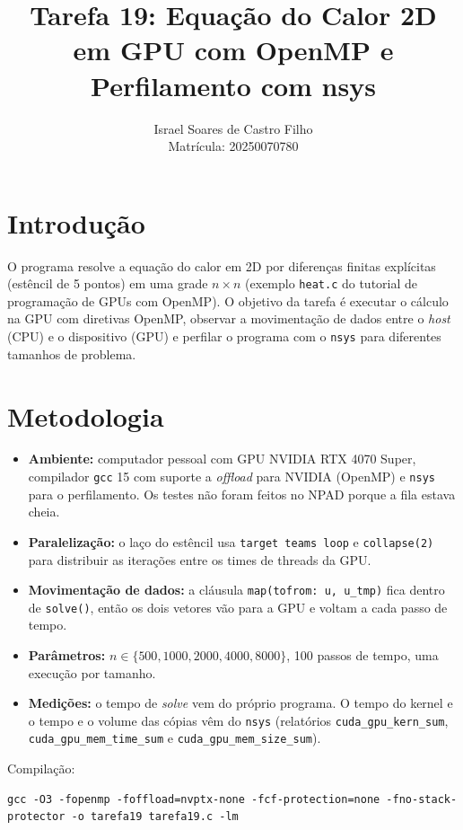 \documentclass[a4paper,12pt]{article}
\title{Tarefa 19: Equação do Calor 2D em GPU com OpenMP e Perfilamento com nsys}
\author{Israel Soares de Castro Filho \\ Matrícula: 20250070780}
\date{}
\begin{document}
\maketitle

\section{Introdução}

O programa resolve a equação do calor em 2D por diferenças finitas explícitas (estêncil de 5 pontos) em uma grade $n \times n$ (exemplo \texttt{heat.c} do tutorial de programação de GPUs com OpenMP). O objetivo da tarefa é executar o cálculo na GPU com diretivas OpenMP, observar a movimentação de dados entre o \emph{host} (CPU) e o dispositivo (GPU) e perfilar o programa com o \texttt{nsys} para diferentes tamanhos de problema.

\section{Metodologia}

\begin{itemize}
    \item \textbf{Ambiente:} computador pessoal com GPU NVIDIA RTX 4070 Super, compilador \texttt{gcc} 15 com suporte a \emph{offload} para NVIDIA (OpenMP) e \texttt{nsys} para o perfilamento. Os testes não foram feitos no NPAD porque a fila estava cheia.
    \item \textbf{Paralelização:} o laço do estêncil usa \texttt{target teams loop} e \texttt{collapse(2)} para distribuir as iterações entre os times de threads da GPU.
    \item \textbf{Movimentação de dados:} a cláusula \texttt{map(tofrom: u, u\_tmp)} fica dentro de \texttt{solve()}, então os dois vetores vão para a GPU e voltam a cada passo de tempo.
    \item \textbf{Parâmetros:} $n \in \{500, 1000, 2000, 4000, 8000\}$, 100 passos de tempo, uma execução por tamanho.
    \item \textbf{Medições:} o tempo de \emph{solve} vem do próprio programa. O tempo do kernel e o tempo e o volume das cópias vêm do \texttt{nsys} (relatórios \texttt{cuda\_gpu\_kern\_sum}, \texttt{cuda\_gpu\_mem\_time\_sum} e \texttt{cuda\_gpu\_mem\_size\_sum}).
\end{itemize}

Compilação:

\begin{lstlisting}[style=cstyle, language={}, numbers=none]
gcc -O3 -fopenmp -foffload=nvptx-none -fcf-protection=none -fno-stack-protector -o tarefa19 tarefa19.c -lm
\end{lstlisting}
\end{document}
